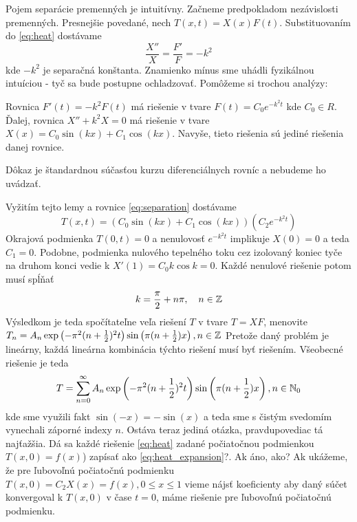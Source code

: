 Pojem separácie premenných je intuitívny. Začneme predpokladom
nezávislosti premenných. Presnejšie povedané, nech
$T(x,t) = X(x) F(t)$. Substituovaním do \ref{eq:heat}
dostávame
\begin{equation}
    \frac{X''}{X} = \frac{F'}{F} = - k^2
    \label{eq:separation}
\end{equation}
kde $-k^2$ je separačná konštanta. Znamienko mínus sme uhádli
fyzikálnou intuíciou - tyč sa bude postupne ochladzovať.
Pomôžeme si trochou analýzy:
\begin{lema}
    Rovnica $F'(t) = -k^2 F(t)$ má riešenie v tvare 
    $F(t) = C_0 e^{-k^2 t}$ kde $C_0 \in R$.
    Ďalej, rovnica $X'' + k^2 X = 0$ má riešenie v tvare
    $X(x) = C_0 \sin(k x) + C_1 \cos(k x)$. Navyše, tieto riešenia sú
    jediné riešenia danej rovnice.
\end{lema}
\begin{dokaz}
    Dôkaz je štandardnou súčasťou kurzu diferenciálnych rovníc a
    nebudeme ho uvádzať.
\end{dokaz}
Vyžitím tejto lemy a rovnice \ref{eq:separation} dostávame
\begin{equation}
    T(x,t) = (C_0 \sin (k x) + C_1 \cos (k x))(C_2 e^{-k^2 t})
\end{equation}
Okrajová podmienka $T(0,t) = 0$ a nenulovosť $e^{-k^2 t}$ 
implikuje $X(0)=0$ a teda $C_1 = 0$.
Podobne, podmienka nulového tepelného toku cez izolovaný koniec tyče
na druhom konci vedie k
$X'(1) = C_0 k \cos k = 0$. Každé nenulové riešenie potom musí spĺňať
\begin{equation}
    k = \frac{\pi}{2} + n \pi, \quad n \in \mathbb{Z}
\end{equation}
Výsledkom je teda spočítateľne veľa riešení $T$ v tvare $T=XF$,
menovite
$T_n = A_n \exp\left(-\pi^2 (n+\frac{1}{2})^2 t \right)
            \sin \left( \pi (n + \frac{1}{2}) x \right), n\in \mathbb{Z}$
Pretože daný problém je lineárny, každá lineárna kombinácia týchto
riešení musí byť riešením. Všeobecné riešenie je teda
\begin{equation}
T = \sum_{n=0}^{\infty} A_n \exp\left(-\pi^2 (n+\frac{1}{2})^2 t \right)
            \sin \left( \pi (n + \frac{1}{2}) x \right), n\in \mathbb{N}_0
    \label{eq:heat_expansion}
\end{equation}
kde sme využili fakt $\sin(-x) = -\sin(x)$ a teda sme s čistým
svedomím vynechali záporné indexy $n$.
Ostáva teraz jediná otázka, pravdupovediac tá najťažšia. Dá sa každé
riešenie \ref{eq:heat} zadané počiatočnou podmienkou $T(x,0) = f(x)$)
zapísať ako \ref{eq:heat_expansion}?. Ak áno, ako? 
Ak ukážeme, že pre ľubovoľnú počiatočnú podmienku 
$T(x,0) = C_2 X(x) = f(x), 0\le x \le 1$ vieme nájsť koeficienty aby
daný súčet konvergoval k $T(x,0)$ v čase $t=0$, máme riešenie pre
ľubovoľnú počiatočnú podmienku.

